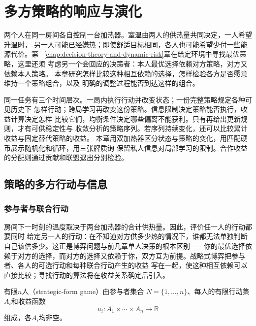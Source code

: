 \chapter{多方策略的响应与演化}
\label{chap:game-theory-and-multi-agent-decision}

两个人在同一房间各自控制一台加热器。室温由两人的供热量共同决定，一人希望升温时，
另一人可能已经嫌热；即使舒适目标相同，各人也可能希望少付一些能源代价。第
~\ref{chap:decision-theory-and-dynamic-risk}章在给定环境中寻找最优策略，这里还须
考虑另一个会回应的决策者：本人最优选择依赖对方策略，对方又依赖本人策略。
本章研究怎样比较这种相互依赖的选择，怎样检验各方是否愿意维持一个策略组合，以及
明确的调整过程能否到达这样的组合。

同一任务有三个时间层次。一局内执行行动并改变状态；一份完整策略规定各种可见历史下
怎样行动；跨局学习再改变这份策略。信息限制决定策略能否执行，收益计算决定怎样
比较它们，均衡条件决定哪些偏离不能获利。只有再给出更新规则，才有可供稳定性与
收敛分析的策略序列。若序列持续变化，还可以比较累计收益与固定替代策略的收益。
本章用双加热器区分状态与策略的变化，用匹配硬币展示随机化和循环，用三张牌质询
保留私人信息对局部学习的限制。合作收益的分配则通过贡献和联盟退出分别检验。

\section{策略的多方行动与信息}
\label{sec:game-actions-information}

\subsection{参与者与联合行动}
\label{sec:game-joint-actions}

房间下一时刻的温度取决于两台加热器的合计供热量。因此，评价任一人的行动都要同时
给定另一人的行动：在不知道对方供多少热的情况下，谁都无法单独判断自己该供多少。这正是博弈问题与前几章单人决策的根本区别——你的最优选择依赖于对方的选择，而对方的选择又依赖于你，双方互为前提。战略式博弈把参与者、各人的可选行动和每种联合行动产生的收益
写在一起，使这种相互依赖可以直接比较；寻找行动的算法将在收益关系确定后引入。

\begin{definition}[有限战略式博弈]
\label{def:game-finite-strategic-game}
有限\(n\)人（strategic-form game）由参与者集合
\(N=\{1,\ldots,n\}\)、每人的有限行动集\(A_i\)和收益函数
\[
  u_i:A_1\times\cdots\times A_n\to\mathbb{R}
\]
组成，各$A_i$均非空。
\end{definition}

